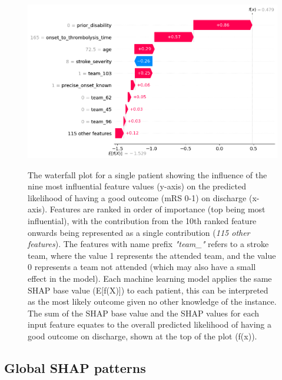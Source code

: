 \begin{figure}[!h]
    \centering%
      \includegraphics[width=0.95\linewidth]{./images/103_xgb_7_features_1fold_binary_waterfall_plot_patient16_with_IVT.png}\\
  \caption{The waterfall plot for a single patient showing the influence of the nine most influential feature values (y-axis) on the predicted likelihood of having a good outcome (mRS 0-1) on discharge (x-axis). Features are ranked in order of importance (top being most influential), with the contribution from the 10th ranked feature onwards being represented as a single contribution (\textit{115 other features}). The features with name prefix \textit{"team\_"} refers to a stroke team, where the value 1 represents the attended team, and the value 0 represents a team not attended (which may also have a small effect in the model). Each machine learning model applies the same SHAP base value (E[f(X)]) to each patient, this can be interpreted as the most likely outcome given no other knowledge of the instance. The sum of the SHAP base value and the SHAP values for each input feature equates to the overall predicted likelihood of having a good outcome on discharge, shown at the top of the plot (f(x)).}
    \label{fig:single_waterfall_with_ivt}
\end{figure}

\subsection{Global SHAP patterns}

